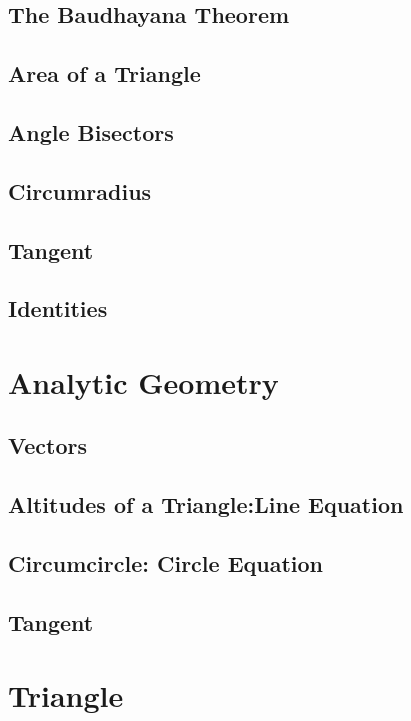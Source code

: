 \documentclass[11pt]{book}
\begin{document}
\section{The Baudhayana Theorem}

%
\section{Area of a Triangle}

\section{Angle Bisectors}

\section{Circumradius}

\section{Tangent}

\section{Identities}

\chapter{Analytic Geometry}
\section{Vectors}

\section{Altitudes of a Triangle:Line Equation}

\section{Circumcircle: Circle Equation}

\section{Tangent}

\chapter{Triangle}

\end{document}
